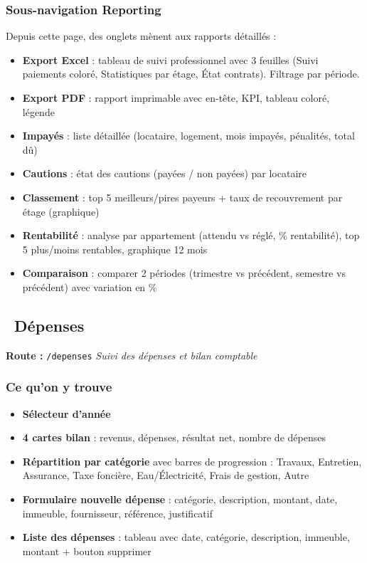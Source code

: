\documentclass[12pt,a4paper]{article}
\begin{document}
\subsubsection{Sous-navigation Reporting}
Depuis cette page, des onglets m\`enent aux rapports d\'etaill\'es :
\begin{itemize}
\item \textbf{Export Excel} : tableau de suivi professionnel avec 3 feuilles (Suivi paiements color\'e, Statistiques par \'etage, \'Etat contrats). Filtrage par p\'eriode.
\item \textbf{Export PDF} : rapport imprimable avec en-t\^ete, KPI, tableau color\'e, l\'egende
\item \textbf{Impay\'es} : liste d\'etaill\'ee (locataire, logement, mois impay\'es, p\'enalit\'es, total d\^u)
\item \textbf{Cautions} : \'etat des cautions (pay\'ees / non pay\'ees) par locataire
\item \textbf{Classement} : top 5 meilleurs/pires payeurs + taux de recouvrement par \'etage (graphique)
\item \textbf{Rentabilit\'e} : analyse par appartement (attendu vs r\'egl\'e, \% rentabilit\'e), top 5 plus/moins rentables, graphique 12 mois
\item \textbf{Comparaison} : comparer 2 p\'eriodes (trimestre vs pr\'ec\'edent, semestre vs pr\'ec\'edent) avec variation en \%
\end{itemize}

\subsection{\faReceipt\ D\'epenses}
\textbf{Route :} \texttt{/depenses} \hfill \textit{Suivi des d\'epenses et bilan comptable}

\subsubsection{Ce qu'on y trouve}
\begin{itemize}
\item \textbf{S\'electeur d'ann\'ee}
\item \textbf{4 cartes bilan} : revenus, d\'epenses, r\'esultat net, nombre de d\'epenses
\item \textbf{R\'epartition par cat\'egorie} avec barres de progression : Travaux, Entretien, Assurance, Taxe fonci\`ere, Eau/\'Electricit\'e, Frais de gestion, Autre
\item \textbf{Formulaire nouvelle d\'epense} : cat\'egorie, description, montant, date, immeuble, fournisseur, r\'ef\'erence, justificatif
\item \textbf{Liste des d\'epenses} : tableau avec date, cat\'egorie, description, immeuble, montant + bouton supprimer
\end{itemize}
\end{document}
